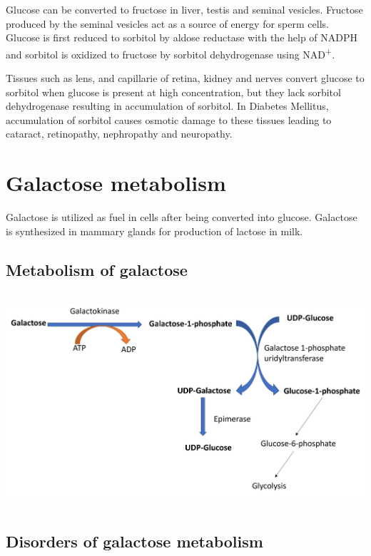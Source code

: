 \documentclass[
]{book}
\begin{document}
Glucose can be converted to fructose in liver, testis and seminal vesicles. Fructose produced by the seminal vesicles act as a source of energy for sperm cells. Glucose is first reduced to sorbitol by aldose reductase with the help of NADPH and sorbitol is oxidized to fructose by sorbitol dehydrogenase using NAD\textsuperscript{+}.

Tissues such as lens, and capillarie of retina, kidney and nerves convert glucose to sorbitol when glucose is present at high concentration, but they lack sorbitol dehydrogenase resulting in accumulation of sorbitol. In Diabetes Mellitus, accumulation of sorbitol causes osmotic damage to these tissues leading to cataract, retinopathy, nephropathy and neuropathy.

\chapter{Galactose metabolism}\label{galactose-metabolism}

Galactose is utilized as fuel in cells after being converted into glucose. Galactose is synthesized in mammary glands for production of lactose in milk.

\section{Metabolism of galactose}\label{metabolism-of-galactose}

\includegraphics[width=\textwidth,height=3.125in]{Images/Galactose.png}

\section{Disorders of galactose metabolism}\label{disorders-of-galactose-metabolism}
\end{document}
